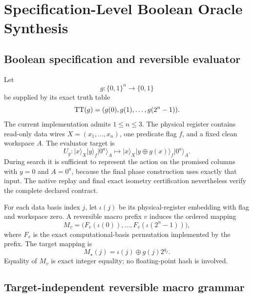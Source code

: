 \section{Specification-Level Boolean Oracle Synthesis}
\label{sec:boolean-oracle}

\subsection{Boolean specification and reversible evaluator}

Let
\begin{equation}
g:\{0,1\}^{n}\rightarrow\{0,1\}
\end{equation}
be supplied by its exact truth table
\begin{equation}
\operatorname{TT}(g)=(g(0),g(1),\ldots,g(2^n-1)).
\label{eq:truth-table}
\end{equation}
The current implementation admits $1\leq n\leq3$.  The physical register contains read-only data wires $X=(x_1,\ldots,x_n)$, one predicate flag $f$, and a fixed clean workspace $A$.  The evaluator target is
\begin{equation}
\boxed{
U_g:\lvert x\rangle_X\lvert y\rangle_f\lvert0^a\rangle_A
\mapsto
\lvert x\rangle_X\lvert y\oplus g(x)\rangle_f\lvert0^a\rangle_A.
}
\label{eq:oracle-evaluator}
\end{equation}
During search it is sufficient to represent the action on the promised columns with $y=0$ and $A=0^a$, because the final phase construction uses exactly that input.  The native replay and final exact isometry certification nevertheless verify the complete declared contract.

For each data basis index $j$, let $\iota(j)$ be its physical-register embedding with flag and workspace zero.  A reversible macro prefix $v$ induces the ordered mapping
\begin{equation}
M_v=\bigl(F_v(\iota(0)),\ldots,F_v(\iota(2^n-1))\bigr),
\label{eq:mapping-key}
\end{equation}
where $F_v$ is the exact computational-basis permutation implemented by the prefix.  The target mapping is
\begin{equation}
M_\star(j)=\iota(j)\oplus g(j)2^{q_f}.
\label{eq:target-mapping}
\end{equation}
Equality of $M_v$ is exact integer equality; no floating-point hash is involved.

\subsection{Target-independent reversible macro grammar}

